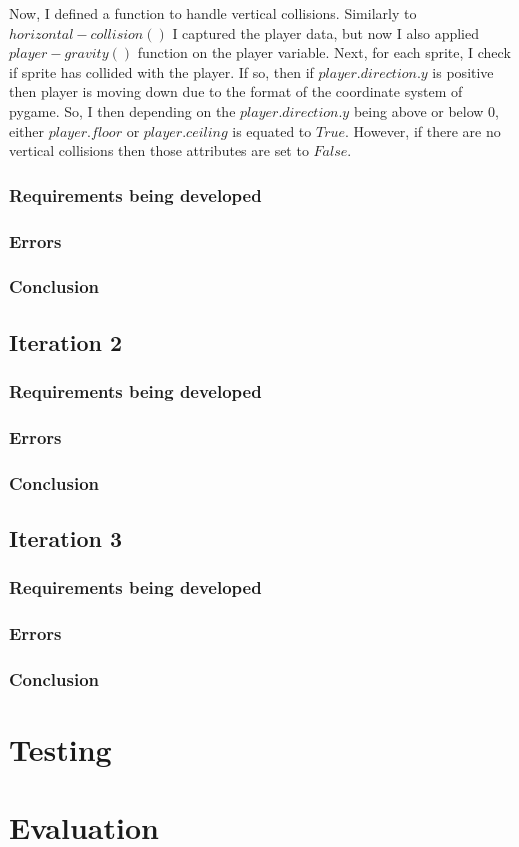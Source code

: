 \documentclass[12pt]{article}
\begin{document}
Now, I defined a function to handle vertical collisions. Similarly to $horizontal-collision()$ I captured the player data, but now I also applied $player-gravity()$ function on the player variable. Next, for each sprite, I check if sprite has collided with the player. If so, then if $player.direction.y$ is positive then player is moving down due to the format of the coordinate system of pygame. So, I then depending on the $player.direction.y$ being above or below 0, either $player.floor$ or $player.ceiling$ is equated  to $True$. However, if there are no vertical collisions then those attributes are set to $False$. 
\subsubsection{Requirements being developed}
\subsubsection{Errors}
\subsubsection{Conclusion}

\subsection{Iteration 2}

\subsubsection{Requirements being developed}
\subsubsection{Errors}
\subsubsection{Conclusion}

\subsection{Iteration 3}
\subsubsection{Requirements being developed}
\subsubsection{Errors}
\subsubsection{Conclusion}

\section{Testing}

\section{Evaluation}
\end{document}
